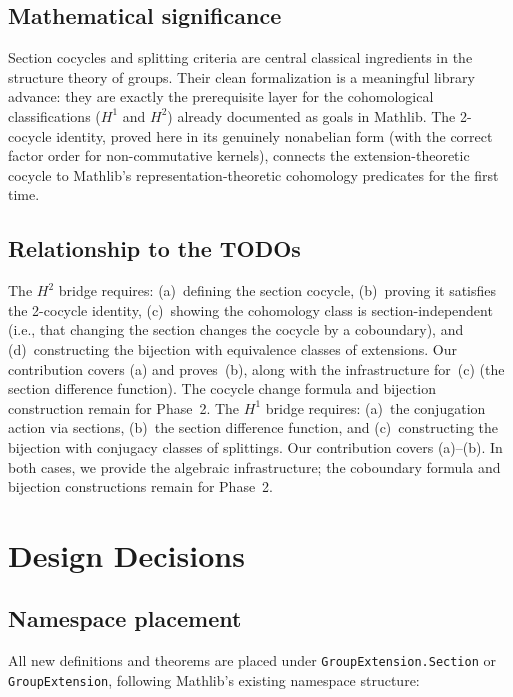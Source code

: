 \documentclass[11pt]{article}
\begin{document}
\subsection{Mathematical significance}

Section cocycles and splitting criteria are central classical ingredients in the
structure theory of groups. Their clean formalization is a meaningful library
advance: they are exactly the prerequisite layer for the cohomological
classifications ($H^1$ and $H^2$) already documented as goals in Mathlib. The
2-cocycle identity, proved here in its genuinely nonabelian form (with the
correct factor order for non-commutative kernels), connects the extension-theoretic
cocycle to Mathlib's representation-theoretic cohomology predicates for the first
time.

\subsection{Relationship to the TODOs}

The $H^2$ bridge requires: (a)~defining the section cocycle, (b)~proving it satisfies
the 2-cocycle identity, (c)~showing the cohomology class is section-independent (i.e.,
that changing the section changes the cocycle by a coboundary), and
(d)~constructing the bijection with equivalence classes of extensions. Our contribution
covers (a) and proves~(b), along with the infrastructure
for~(c) (the section difference function). The cocycle change formula and bijection
construction remain for Phase~2. The $H^1$ bridge requires:
(a)~the conjugation action via sections, (b)~the section difference function, and
(c)~constructing the bijection with conjugacy classes of splittings. Our contribution
covers (a)--(b). In both cases, we provide the algebraic infrastructure; the coboundary
formula and bijection constructions remain for Phase~2.

\section{Design Decisions}\label{sec:design}

\subsection{Namespace placement}

All new definitions and theorems are placed under \texttt{GroupExtension.Section} or
\texttt{GroupExtension}, following Mathlib's existing namespace structure:
\end{document}
